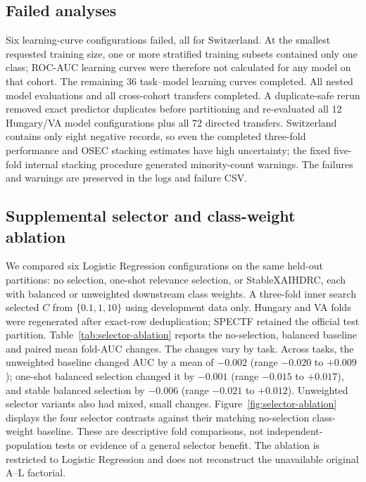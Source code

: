 \documentclass[conference]{IEEEtran}
\begin{document}
\subsection{Failed analyses}
Six learning-curve configurations failed, all for Switzerland. At the smallest requested training size, one or more stratified training subsets contained only one class; ROC-AUC learning curves were therefore not calculated for any model on that cohort. The remaining 36 task--model learning curves completed. All nested model evaluations and all cross-cohort transfers completed. A duplicate-safe rerun removed exact predictor duplicates before partitioning and re-evaluated all 12 Hungary/VA model configurations plus all 72 directed transfers. Switzerland contains only eight negative records, so even the completed three-fold performance and OSEC stacking estimates have high uncertainty; the fixed five-fold internal stacking procedure generated minority-count warnings. The failures and warnings are preserved in the logs and failure CSV.

\subsection{Supplemental selector and class-weight ablation}
We compared six Logistic Regression configurations on the same held-out partitions: no selection, one-shot relevance selection, or StableXAIHDRC, each with balanced or unweighted downstream class weights. A three-fold inner search selected $C$ from $\{0.1,1,10\}$ using development data only. Hungary and VA folds were regenerated after exact-row deduplication; SPECTF retained the official test partition. Table~\ref{tab:selector-ablation} reports the no-selection, balanced baseline and paired mean fold-AUC changes. The changes vary by task. Across tasks, the unweighted baseline changed AUC by a mean of $-0.002$ (range $-0.020$ to $+0.009$); one-shot balanced selection changed it by $-0.001$ (range $-0.015$ to $+0.017$), and stable balanced selection by $-0.006$ (range $-0.021$ to $+0.012$). Unweighted selector variants also had mixed, small changes. Figure~\ref{fig:selector-ablation} displays the four selector contrasts against their matching no-selection class-weight baseline. These are descriptive fold comparisons, not independent-population tests or evidence of a general selector benefit. The ablation is restricted to Logistic Regression and does not reconstruct the unavailable original A--L factorial.

\begin{table}[t]
\centering
\caption{No-selection balanced Logistic Regression fold-mean ROC-AUC and matched mean-fold changes for unweighted, one-shot, and stable-selection conditions. Asterisks mark duplicate-safe folds. SPECTF is one official test estimate.}
\label{tab:selector-ablation}
\scriptsize
\setlength{\tabcolsep}{3pt}

\end{table}
\end{document}
